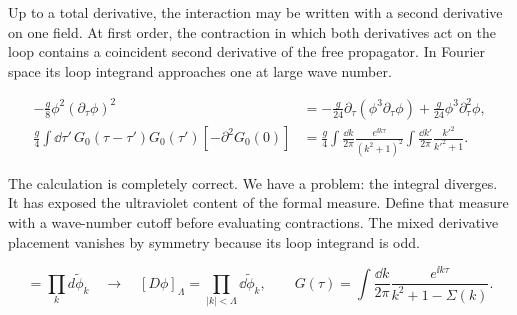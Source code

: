 Up to a total derivative, the interaction may be written with a second derivative on one field. At first order, the contraction in which both derivatives act on the loop contains a coincident second derivative of the free propagator. In Fourier space its loop integrand approaches one at large wave number.

\begin{align}
  -\frac g8\phi^2(\partial_\tau\phi)^2
  &=-\frac g{24}\partial_\tau(\phi^3\partial_\tau\phi)
  +\frac g{24}\phi^3\partial_\tau^2\phi,
  \label{eq:253a-ch02-derivative-integration-by-parts}\\
  \frac g4\int \dd\tau'\,G_0(\tau-\tau')G_0(\tau')[-\partial^2G_0(0)]
  &=\frac g4\int\frac{\dd k}{2\pi}\frac{e^{\ii k\tau}}{(k^2+1)^2}
  \int\frac{\dd k'}{2\pi}\frac{k'^2}{k'^2+1}.
  \label{eq:253a-ch02-divergent-derivative-contraction}
\end{align}

The calculation is completely correct. We have a problem: the integral diverges. It has exposed the ultraviolet content of the formal measure. Define that measure with a wave-number cutoff before evaluating contractions. The mixed derivative placement vanishes by symmetry because its loop integrand is odd.

\begin{equation}
  [D\phi]=\prod_kd\widetilde\phi_k
  \quad\longrightarrow\quad
  [D\phi]_\Lambda=\prod_{|k|<\Lambda}\dd\widetilde\phi_k,
  \qquad
  G(\tau)=\int\frac{\dd k}{2\pi}\frac{e^{\ii k\tau}}{k^2+1-\Sigma(k)}.
  \label{eq:253a-ch02-cutoff-measure}
\end{equation}

